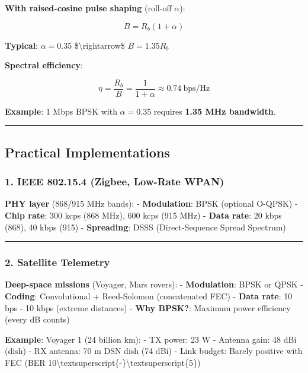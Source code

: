 \textbf{With raised-cosine pulse shaping} (roll-off \(\alpha\)):

\[
B = R_b(1 + \alpha)
\]

\textbf{Typical}: \(\alpha = 0.35\) \$\textbackslash rightarrow\$
\(B = 1.35 R_b\)

\textbf{Spectral efficiency}:

\[
\eta = \frac{R_b}{B} = \frac{1}{1+\alpha} \approx 0.74\ \text{bps/Hz}
\]

\textbf{Example}: 1 Mbps BPSK with \(\alpha = 0.35\) requires
\textbf{1.35 MHz bandwidth}.

\begin{center}\rule{0.5\linewidth}{0.5pt}\end{center}

\subsection{Practical Implementations}\label{practical-implementations}

\subsubsection{1. IEEE 802.15.4 (Zigbee, Low-Rate
WPAN)}\label{ieee-802.15.4-zigbee-low-rate-wpan}

\textbf{PHY layer} (868/915 MHz bands): - \textbf{Modulation}: BPSK
(optional O-QPSK) - \textbf{Chip rate}: 300 kcps (868 MHz), 600 kcps
(915 MHz) - \textbf{Data rate}: 20 kbps (868), 40 kbps (915) -
\textbf{Spreading}: DSSS (Direct-Sequence Spread Spectrum)

\begin{center}\rule{0.5\linewidth}{0.5pt}\end{center}

\subsubsection{2. Satellite Telemetry}\label{satellite-telemetry}

\textbf{Deep-space missions} (Voyager, Mars rovers): -
\textbf{Modulation}: BPSK or QPSK - \textbf{Coding}: Convolutional +
Reed-Solomon (concatenated FEC) - \textbf{Data rate}: 10 bps - 10 kbps
(extreme distances) - \textbf{Why BPSK?}: Maximum power efficiency
(every dB counts)

\textbf{Example}: Voyager 1 (24 billion km): - TX power: 23 W - Antenna
gain: 48 dBi (dish) - RX antenna: 70 m DSN dish (74 dBi) - Link budget:
Barely positive with FEC (BER
10\textbackslash textsuperscript\{-\}\textbackslash textsuperscript\{5\})

